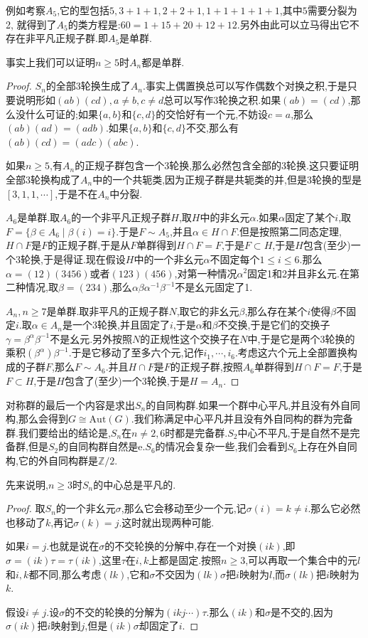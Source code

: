 例如考察$A_5$,它的型包括$5,3+1+1,2+2+1,1+1+1+1+1$,其中$5$需要分裂为2, 就得到了$A_5$的类方程是:$60=1+15+20+12+12$.另外由此可以立马得出它不存在非平凡正规子群.即$A_5$是单群.

事实上我们可以证明$n\ge5$时$A_n$都是单群.
\begin{proof}
	
	$S_n$的全部3轮换生成了$A_n$.事实上偶置换总可以写作偶数个对换之积,于是只要说明形如$(ab)(cd),a\not=b,c\not=d$总可以写作3轮换之积.如果$(ab)=(cd)$,那么没什么可证的;如果$\{a,b\}$和$\{c,d\}$的交恰好有一个元,不妨设$c=a$,那么$(ab) (ad)=(adb)$.如果$\{a,b\}$和$\{c,d\}$不交,那么有$(ab)(cd)=(adc)(abc)$.
	
	如果$n\ge5$,有$A_n$的正规子群包含一个3轮换,那么必然包含全部的3轮换.这只要证明全部3轮换构成了$A_n$中的一个共轭类,因为正规子群是共轭类的并,但是3轮换的型是$[3,1,1,\cdots]$,于是不在$A_n$中分裂.
	
	$A_6$是单群.取$A_6$的一个非平凡正规子群$H$,取$H$中的非幺元$\alpha$.如果$\alpha$固定了某个$i$,取$F=\{\beta\in A_6\mid \beta(i)=i\}$.于是$F\sim A_5$,并且$\alpha\in H\cap F$.但是按照第二同态定理,$H\cap F$是$F$的正规子群,于是从$F$单群得到$H\cap F=F$,于是$F\subset H$,于是$H$包含(至少)一个3轮换,于是得证.现在假设$H$中的一个非幺元$\alpha$不固定每个$1\le i\le6$.那么$\alpha=(12)(3456)$或者$(123)(456)$,对第一种情况$\alpha^2$固定1和2并且非幺元.在第二种情况,取$\beta=(234)$,那么$\alpha\beta\alpha^{-1}\beta^{-1}$不是幺元固定了1.
	
	$A_n,n\ge7$是单群.取非平凡的正规子群$N$,取它的非幺元$\beta$,那么存在某个$i$使得$\beta$不固定$i$.取$\alpha\in A_n$是一个3轮换,并且固定了$i$,于是$\alpha$和$\beta$不交换,于是它们的交换子$\gamma=\beta^ {\alpha}\beta^{-1}$不是幺元.另外按照$N$的正规性这个交换子在$N$中,于是它是两个3轮换的乘积$(\beta^{\alpha})\beta^{-1}$.于是它移动了至多六个元,记作$i_1,\cdots,i_6$.考虑这六个元上全部置换构成的子群$F$,那么$F\sim A_6$.并且$H\cap F$是$F$的正规子群,按照$A_6$单群得到$H\cap F=F$,于是$F\subset H$,于是$H$包含了(至少)一个3轮换,于是$H=A_n$.
\end{proof}

对称群的最后一个内容是求出$S_n$的自同构群.如果一个群中心平凡,并且没有外自同构,那么会得到$G\cong\mathrm{Aut}(G)$.我们称满足中心平凡并且没有外自同构的群为完备群.我们要给出的结论是,$S_n$在$n\not=2,6$时都是完备群.$S_2$中心不平凡,于是自然不是完备群,但是$S_2$的自同构群自然是{e}.$S_6$的情况会复杂一些,我们会看到$S_6$上存在外自同构,它的外自同构群是$\mathbb{Z}/2$.

先来说明,$n\ge3$时$S_n$的中心总是平凡的.
\begin{proof}
	
	取$S_n$的一个非幺元$\sigma$,那么它会移动至少一个元,记$\sigma(i)=k\not=i$.那么它必然也移动了$k$,再记$\sigma(k)=j$.这时就出现两种可能.
	
	如果$i=j$.也就是说在$\sigma$的不交轮换的分解中,存在一个对换$(ik)$,即$\sigma=(ik)\tau=\tau(ik)$,这里$\tau$在$i,k$上都是固定.按照$n\ge3$,可以再取一个集合中的元$l$和$i,k$都不同,那么考虑$(lk)$,它和$\sigma$不交因为$(lk)\sigma$把$i$映射为$l$,而$\sigma(lk)$把$i$映射为$k$.
	
	假设$i\not=j$.设$\sigma$的不交的轮换的分解为$(ikj\cdots)\tau$.那么$(ik)$和$\sigma$是不交的,因为$\sigma(ik)$把$i$映射到$j$,但是$(ik)\sigma$却固定了$i$.
\end{proof}

